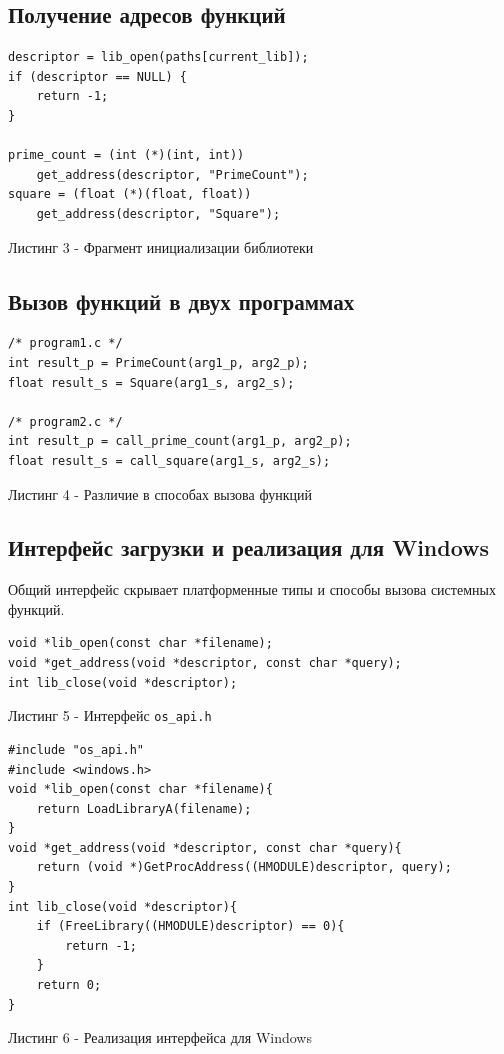 \documentclass[12pt,a4paper]{article}
\begin{document}
\subsection{Получение адресов функций}
\begin{lstlisting}
descriptor = lib_open(paths[current_lib]);
if (descriptor == NULL) {
    return -1;
}

prime_count = (int (*)(int, int))
    get_address(descriptor, "PrimeCount");
square = (float (*)(float, float))
    get_address(descriptor, "Square");
\end{lstlisting}
\begin{center}\small Листинг 3 - Фрагмент инициализации библиотеки\end{center}

\subsection{Вызов функций в двух программах}
\begin{lstlisting}
/* program1.c */
int result_p = PrimeCount(arg1_p, arg2_p);
float result_s = Square(arg1_s, arg2_s);

/* program2.c */
int result_p = call_prime_count(arg1_p, arg2_p);
float result_s = call_square(arg1_s, arg2_s);
\end{lstlisting}
\begin{center}\small Листинг 4 - Различие в способах вызова функций\end{center}

\subsection{Интерфейс загрузки и реализация для Windows}
Общий интерфейс скрывает платформенные типы и способы вызова системных функций.
\begin{lstlisting}
void *lib_open(const char *filename);
void *get_address(void *descriptor, const char *query);
int lib_close(void *descriptor);
\end{lstlisting}
\begin{center}\small Листинг 5 - Интерфейс \texttt{os\_api.h}\end{center}

\begin{lstlisting}
#include "os_api.h"
#include <windows.h>
void *lib_open(const char *filename){
    return LoadLibraryA(filename);
}
void *get_address(void *descriptor, const char *query){
    return (void *)GetProcAddress((HMODULE)descriptor, query);
}
int lib_close(void *descriptor){
    if (FreeLibrary((HMODULE)descriptor) == 0){
        return -1;
    }
    return 0;
}
\end{lstlisting}
\begin{center}\small Листинг 6 - Реализация интерфейса для Windows\end{center}
\end{document}
